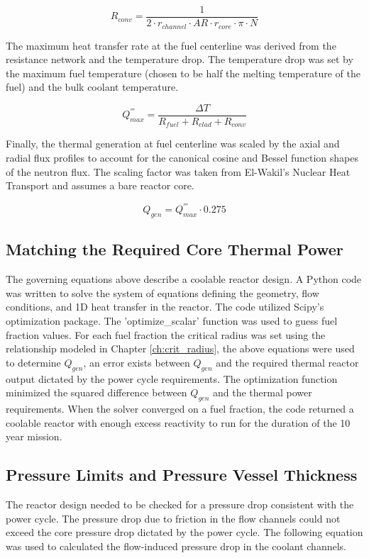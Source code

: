\begin{equation}
    R_{conv} = \frac{1}{2\cdot r_{channel}\cdot AR\cdot r_{core} \cdot \pi\cdot N}
\end{equation}

The maximum heat transfer rate at the fuel centerline was derived from the
resistance network and the temperature drop. The temperature drop was set
by the maximum fuel temperature (chosen to be half the melting temperature of
the fuel) and the bulk coolant temperature.

\begin{equation}
    Q^{'''}_{max} = \frac{\Delta T}{R_{fuel} + R_{clad} + R_{conv}}
\end{equation}

Finally, the thermal generation at fuel centerline was scaled by the axial and
radial flux profiles to account for the canonical cosine and Bessel function
shapes of the neutron flux. The scaling factor was taken from
El-Wakil's Nuclear Heat Transport \citep{heat_trans_wakil} and assumes a 
bare reactor core.

\begin{equation}
    Q_{gen} = Q^{'''}_{max} \cdot 0.275
\end{equation}

\subsection{Matching the Required Core Thermal Power}
The governing equations above describe a coolable
reactor design. A Python code was written to solve the system of equations
defining the geometry, flow conditions, and 1D heat transfer in the reactor. The
code utilized Scipy's optimization package. The 'optimize\_scalar' function was
used to guess fuel fraction values. For each fuel fraction the critical radius
was set using the relationship modeled in Chapter \ref{ch:crit_radius}, the above equations
were used to determine $Q_{gen}$, an error exists between $Q_{gen}$ and the
required thermal reactor output dictated by the power cycle requirements. The
optimization function minimized the squared difference between $Q_{gen}$ and the
thermal power requirements. When the solver converged on a fuel fraction, the
code returned a coolable reactor with enough excess reactivity to run for the
duration of the 10 year mission.

\subsection{Pressure Limits and Pressure Vessel Thickness}
The reactor design needed to be checked for a pressure drop consistent with the
power cycle. The pressure drop due to friction in the flow channels could not
exceed the core pressure drop dictated by the power cycle. The following
equation was used to calculated the flow-induced pressure drop in the coolant
channels.

